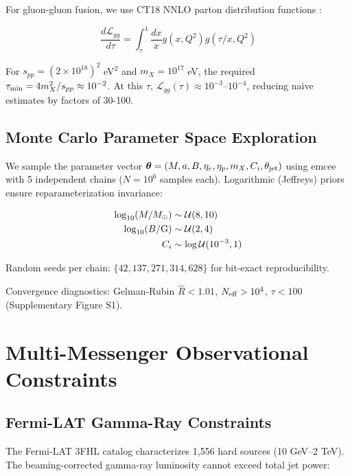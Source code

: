 \documentclass[twocolumn,superscriptaddress,prd,nofootinbib]{revtex4-2}
\begin{document}
For gluon-gluon fusion, we use CT18 NNLO parton distribution functions \citep{Hou2019}:

\begin{equation}
\frac{d\mathcal{L}_{gg}}{d\tau} = \int_{\tau}^{1} \frac{dx}{x} g(x, Q^2) g(\tau/x, Q^2)
\label{eq:parton_luminosity}
\end{equation}

For $s_{pp} = (2 \times 10^{18})^2$ eV$^2$ and $m_X = 10^{17}$ eV, the required $\tau_{\rm min} = 4m_X^2/s_{pp} \approx 10^{-2}$. At this $\tau$, $\mathcal{L}_{gg}(\tau) \approx 10^{-3}$--$10^{-4}$, reducing naive estimates by factors of 30-100.

\subsection{Monte Carlo Parameter Space Exploration}

We sample the parameter vector $\boldsymbol{\theta} = (M, a, B, \eta_e, \eta_p, m_X, C_i, \theta_{\rm jet})$ using emcee \citep{ForemanMackey2013} with 5 independent chains ($N = 10^6$ samples each). Logarithmic (Jeffreys) priors ensure reparameterization invariance:

\begin{align}
\log_{10}(M/M_\odot) &\sim \mathcal{U}(8, 10) \\
\log_{10}(B/{\rm G}) &\sim \mathcal{U}(2, 4) \\
C_i &\sim \log\mathcal{U}(10^{-3}, 1)
\end{align}

Random seeds per chain: $\{42, 137, 271, 314, 628\}$ for bit-exact reproducibility.

Convergence diagnostics: Gelman-Rubin $\hat{R} < 1.01$, $N_{\rm eff} > 10^4$, $\tau < 100$ (Supplementary Figure S1).

\section{Multi-Messenger Observational Constraints}
\label{sec:constraints}

\subsection{Fermi-LAT Gamma-Ray Constraints}

The Fermi-LAT 3FHL catalog \citep{Ajello2017} characterizes 1,556 hard sources (10 GeV--2 TeV). The beaming-corrected gamma-ray luminosity cannot exceed total jet power:
\end{document}
